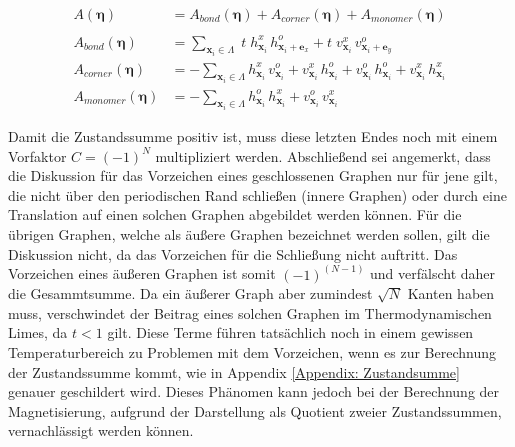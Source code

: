  \begin{grayframe}[frametitle = {Graßmann-Wirkung zur Reformulierung des Ising-Modells}]

\begin{equation} \label{eq: G-Wirkung Ising}
    \begin{aligned}
        A(\bm{\eta})  &= A_{bond}(\bm{\eta}) + A_{corner}(\bm{\eta}) + A_{monomer}(\bm{\eta}) \\
                 &\\
        A_{bond}(\bm{\eta}) &= \sum_{\bm{x}_i \in \Lambda} 
            \; t \; h_{\bm{x}_i}^x \,h_{\bm{x}_i+\bm{e}_x}^o
            + t \; v_{\bm{x}_i}^x \,v_{\bm{x}_i+\bm{e}_y}^o \\
        A_{corner}(\bm{\eta}) &= - \sum_{\bm{x}_i \in \Lambda}  
            h_{\bm{x}_i}^x \,v_{\bm{x}_i}^o  
            + v_{\bm{x}_i}^x\, h_{\bm{x}_i}^o 
            + v_{\bm{x}_i}^o \,h_{\bm{x}_i}^o
            + v_{\bm{x}_i}^x \,h_{\bm{x}_i}^x\\
        A_{monomer}(\bm{\eta}) &= -\sum_{\bm{x}_i \in \Lambda} 
            h_{\bm{x}_i}^o \,h_{\bm{x}_i}^x 
            + v_{\bm{x}_i}^o \,v_{\bm{x}_i}^x
    \end{aligned}
\end{equation}
\end{grayframe}

\noindent Damit die Zustandssumme positiv ist, muss diese letzten Endes noch mit einem Vorfaktor $C = (-1)^N$ multipliziert werden. 
Abschließend sei angemerkt, dass die Diskussion für das Vorzeichen eines geschlossenen Graphen nur für jene gilt, die nicht über den periodischen Rand schließen (innere Graphen) oder durch eine Translation auf einen solchen Graphen abgebildet werden können.  Für die übrigen Graphen, welche als äußere Graphen bezeichnet werden sollen, gilt die Diskussion nicht, da das Vorzeichen für die Schließung nicht auftritt. Das Vorzeichen eines äußeren Graphen ist somit $(-1)^{(N-1)}$  und verfälscht daher die Gesammtsumme.
Da ein äußerer Graph aber zumindest $\sqrt{N}$ Kanten haben muss, verschwindet der Beitrag eines solchen Graphen im Thermodynamischen Limes, da $t<1$ gilt. Diese Terme führen tatsächlich noch in einem gewissen Temperaturbereich zu Problemen mit dem Vorzeichen, wenn es zur Berechnung der Zustandssumme kommt, wie in Appendix \ref{Appendix: Zustandsumme} genauer geschildert wird. Dieses Phänomen kann jedoch bei der Berechnung der Magnetisierung, aufgrund der Darstellung als Quotient zweier Zustandssummen, vernachlässigt werden können. 

